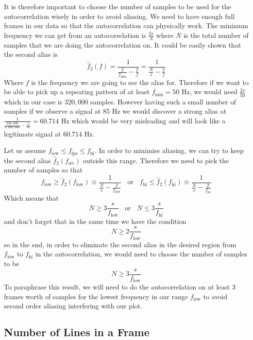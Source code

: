 \documentclass[a4paper,12pt,twoside,openright]{report}
\begin{document}
It is therefore important to choose the number of samples to be used for the autocorrelation wisely in order to avoid aliasing. We need to have enough full frames in our data so that the autocorrelation can physically work. The minimum frequency we can get from an autocorrelation is $\frac{2 s}{N}$ where $N$ is the total number of samples that we are doing the autocorrelation on. It could be easily shown that the second alias is
\begin{equation}
\hat{f}_{2}(f) = \frac{1}{\frac{2}{f_\text{min}}-\frac{2}{f}} = \frac{1}{\frac{N}{s}-\frac{2}{f}}
\end{equation}
Where $f$ is the frequency we are going to see the alias for. Therefore if we want to be able to pick up a repeating pattern of at least $f_\text{min} = 50$ Hz, we would need $\frac{2 s}{50}$ which in our case is $320,000$ samples. However having such a small number of samples if we observe a signal at 85 Hz we would discover a strong alias at $\frac{1}{\frac{320,000}{8,000,000}-\frac{2}{85} } = 60.714$ Hz which would be very misleading and will look like a legitimate signal at $60.714$ Hz. 

Let us assume $f_\text{low} \leq f_\text{fps} \leq f_\text{hi}$. In order to minimise aliasing, we can try to keep the second alias $\hat{f}_{2}(f_\text{src})$ outside this range. Therefore we need to pick the number of samples so that
$$f_\text{low} \geq \hat{f}_{2}(f_\text{low}) \equiv \frac{1}{\frac{N}{s}-\frac{2}{f_\text{low}}}  \,\,\,\,\ \text{or} \,\,\,\,\ f_\text{hi} \leq \hat{f}_{2}(f_\text{hi}) \equiv \frac{1}{\frac{N}{s}-\frac{2}{f_\text{hi}}}  $$
Which means that
$$ N \geq 3 \frac{s}{f_\text{low}} \,\,\,\,\ \text{or} \,\,\,\,\ N \leq 3 \frac{s}{f_\text{hi}} $$
and don't forget that in the same time we have the condition
$$N \geq 2 \frac{s}{f_\text{low}}$$
so in the end, in order to eliminate the second alias in the desired region from $f_\text{low}$ to $f_\text{hi}$ in the autocorrelation, we would need to choose the number of samples to be
\begin{equation}
\label{eq:autocorraliasingcondition}
N \geq 3 \frac{s}{f_\text{low}}
\end{equation}
To paraphrase this result, we will need to do the autocorrelation on at least 3 frames worth of samples for the lowest frequency in our range $f_\text{low}$ to avoid second order aliasing interfering with our plot.

\subsection{Number of Lines in a Frame}
\end{document}
